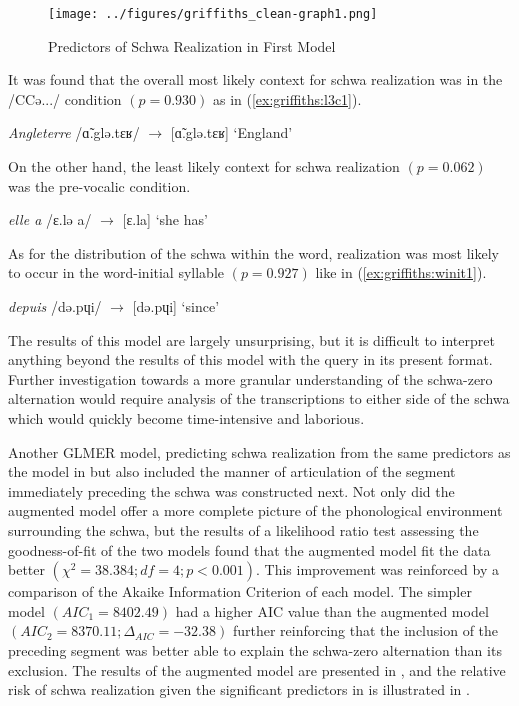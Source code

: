 \documentclass[output=paper,colorlinks,citecolor=brown,
]{langscibook}
\begin{document}
\begin{figure}

\texttt{[image: ../figures/griffiths\_clean-graph1.png]}
\caption{Predictors of Schwa Realization in First Model}
\label{fig:griffiths:clean.graph1}
\end{figure}
It was found that the overall most likely context for schwa realization was in the /CCə.../ condition $(p=0.930)$ as in (\ref{ex:griffiths:l3c1}).
\begin{exe}
\ex\label{ex:griffiths:l3c1} \textit{Angleterre} /ɑ̃.glə.tɛʁ/ $\rightarrow$ [ɑ̃.glə.tɛʁ] `England'
\end{exe}
On the other hand, the least likely context for schwa realization $(p=0.062)$ was the pre-vocalic condition.
\begin{exe}
\ex\label{ex:griffiths:prev1} \textit{elle a} /ɛ.lə a/ $\rightarrow$ [ɛ.la] `she has'
\end{exe}
As for the distribution of the schwa within the word, realization was most likely to occur in the word-initial syllable $(p=0.927)$ like in (\ref{ex:griffiths:winit1}).
\begin{exe}
\ex\label{ex:griffiths:winit1} \textit{depuis} /də.pɥi/ $\rightarrow$ [də.pɥi] `since'
\end{exe}
The results of this model are largely unsurprising, but it is difficult to interpret anything beyond the results of this model with the query in its present format. Further investigation towards a more granular understanding of the schwa-zero alternation would require analysis of the transcriptions to either side of the schwa which would quickly become time-intensive and laborious.

Another GLMER model, predicting schwa realization from the same predictors as the model in  but also included the manner of articulation of the segment immediately preceding the schwa was constructed next.  Not only did the augmented model offer a more complete picture of the phonological environment surrounding the schwa, but the results of a likelihood ratio test assessing the goodness-of-fit of the two models found that the augmented model fit the data better $(\chi^2 = 38.384; df = 4; p <0.001)$. This improvement was reinforced by a comparison of the Akaike Information Criterion \citep[AIC;]{akaike} of each model. The simpler model $(AIC_1=8402.49)$ had a higher AIC value than the augmented model $(AIC_2=8370.11; \Delta_{AIC}=-32.38)$ further reinforcing that the inclusion of the preceding segment was better able to explain the schwa-zero alternation than its exclusion. The results of the augmented model are presented in , and the relative risk of schwa realization given the significant predictors in  is illustrated in .
\end{document}
